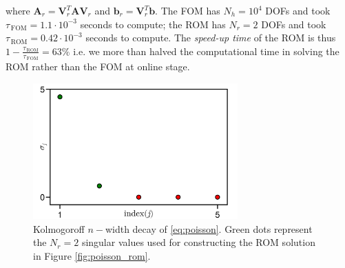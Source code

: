 \documentclass[../main.tex]{subfiles}
\begin{document}
where $\boldsymbol{A}_{r} = \boldsymbol{V}_{r}^{T}\boldsymbol{A}\boldsymbol{V}_{r}$ and $\boldsymbol{b}_{r}=\boldsymbol{V}_{r}^{T}\boldsymbol{b}$.
The FOM has $N_{h}=10^{4}$ DOFs and took $\tau_{\,\text{FOM}} = 1.1\cdot10^{-3}$ seconds to compute; the ROM has $N_{r}=2$ DOFs and took $\tau_{\,\text{ROM}} = 0.42\cdot10^{-3}$ seconds to compute.
The \textit{speed-up time} of the ROM is thus $1 - \frac{\tau_{\,\text{ROM}}}{\tau_{\,\text{FOM}}} = 63\%$ i.e. we more than halved the computational time in solving the ROM rather than the FOM at online stage.

\begin{figure}[H]
    \centering 
    \includegraphics[keepaspectratio, width=0.7\textwidth]{../figures/fig:poisson_decay.png}
    \caption{Kolmogoroff $n-$width decay of \eqref{eq:poisson}. Green dots represent the $N_{r}=2$ singular values used for constructing the ROM solution in Figure \ref{fig:poisson_rom}.}
    \label{fig:poisson_decay}
\end{figure}
\end{document}
